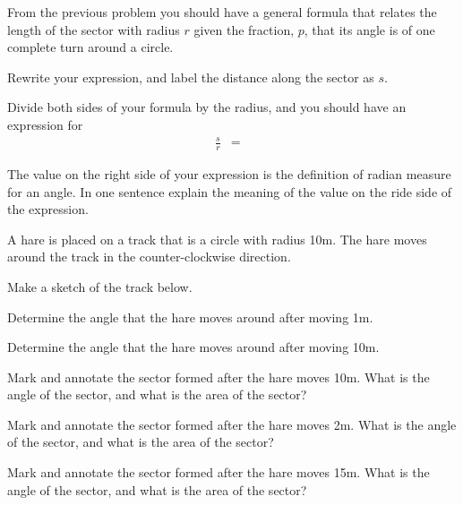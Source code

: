 \begin{problem}
\begin{subproblem}
  \end{subproblem}

\clearpage

\item From the previous problem you should have a general formula that
  relates the length of the sector with radius $r$ given the
  fraction, $p$, that its angle is of one complete turn around a
  circle.

  \begin{subproblem}
  \item Rewrite your expression, and label the distance along the
    sector as $s$.
    \vfill
  \item Divide both sides of your formula by the radius, and you
    should have an expression for
    \begin{eqnarray*}
    \frac{s}{r} & = &
    \end{eqnarray*}

  \item The value on the right side of your expression is the
    definition of radian measure for an angle. In one sentence explain
    the meaning of the value on the ride side of the expression.

    \vfill

  \end{subproblem}

  \clearpage

\item A hare is placed on a track that is a circle with radius
  10m. The hare moves around the track in the counter-clockwise
  direction.
  \begin{subproblem}
  \item Make a sketch of the track below.
    \vfill

  \item Determine the angle that the hare moves around after moving
    1m.   
    \vfill

  \item Determine the angle that the hare moves around after moving 10m.
    \vfill

  \item Mark and annotate the sector formed after the hare moves
    10m. What is the angle of the sector, and what is the area of the
    sector?
    \vfill

  \item Mark and annotate the sector formed after the hare moves
    2m. What is the angle of the sector, and what is the area of the
    sector?
    \vfill
  \item Mark and annotate the sector formed after the hare moves
    15m. What is the angle of the sector, and what is the area of the
    sector?
    \vfill
  \end{subproblem}


\end{problem}
